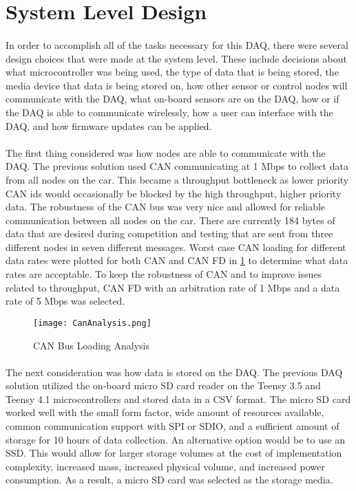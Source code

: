 \section{System Level Design}

\paragraph{}
In order to accomplish all of the tasks necessary for this DAQ, there were several design choices that were made at the system level.
These include decisions about what microcontroller was being used, the type of data that is being stored, the media device that data is being stored on, how other sensor or control nodes will communicate with the DAQ, what on-board sensors are on the DAQ, how or if the DAQ is able to communicate wirelessly, how a user can interface with the DAQ, and how firmware updates can be applied.

\paragraph{}
The first thing considered was how nodes are able to communicate with the DAQ.
The previous solution used CAN communicating at 1 Mbps to collect data from all nodes on the car.
This became a throughput bottleneck as lower priority CAN ids would occasionally be blocked by the high throughput, higher priority data.
The robustness of the CAN bus was very nice and allowed for reliable communication between all nodes on the car.
There are currently 184 bytes of data that are desired during competition and testing that are sent from three different nodes in seven different messages.
Worst case CAN loading for different data rates were plotted for both CAN and CAN FD in \cref{fig:CANAnalysis} to determine what data rates are acceptable.
To keep the robustness of CAN and to improve issues related to throughput, CAN FD with an arbitration rate of 1 Mbps and a data rate of 5 Mbps was selected.

\begin{figure}[H]
	\centering
	\texttt{[image: CanAnalysis.png]}
	\caption{CAN Bus Loading Analysis}
	\label{fig:CANAnalysis}
\end{figure}

\paragraph{}
The next consideration was how data is stored on the DAQ.
The previous DAQ solution utilized the on-board micro SD card reader on the Teensy 3.5 and Teensy 4.1 microcontrollers and stored data in a CSV format.
The micro SD card worked well with the small form factor, wide amount of resources available, common communication support with SPI or SDIO, and a sufficient amount of storage for 10 hours of data collection.
An alternative option would be to use an SSD.
This would allow for larger storage volumes at the cost of implementation complexity, increased mass, increased physical volume, and increased power consumption.
As a result, a micro SD card was selected as the storage media.


